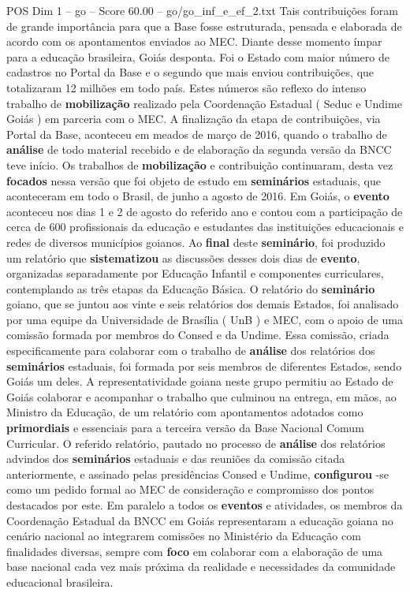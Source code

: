 \begin{textsample}{POS Dim 1 – go – Score 60.00 – go/go\_inf\_e\_ef\_2.txt}
Tais contribuições foram de grande importância para que a Base fosse estruturada, pensada e elaborada de acordo com os apontamentos enviados ao MEC.
Diante desse momento ímpar para a educação brasileira, Goiás desponta.
Foi o Estado com maior número de cadastros no Portal da Base e o segundo que mais enviou contribuições, que totalizaram 12 milhões em todo país.
Estes números são reflexo do intenso trabalho de \textbf{mobilização} realizado pela Coordenação Estadual ( Seduc e Undime Goiás ) em parceria com o MEC.
A finalização da etapa de contribuições, via Portal da Base, aconteceu em meados de março de 2016, quando o trabalho de \textbf{análise} de todo material recebido e de elaboração da segunda versão da BNCC teve início.
Os trabalhos de \textbf{mobilização} e contribuição continuaram, desta vez \textbf{focados} nessa versão que foi objeto de estudo em \textbf{seminários} estaduais, que aconteceram em todo o Brasil, de junho a agosto de 2016.
Em Goiás, o \textbf{evento} aconteceu nos dias 1 e 2 de agosto do referido ano e contou com a participação de cerca de 600 profissionais da educação e estudantes das instituições educacionais e redes de diversos municípios goianos.
Ao \textbf{final} deste \textbf{seminário}, foi produzido um relatório que \textbf{sistematizou} as discussões desses dois dias de \textbf{evento}, organizadas separadamente por Educação Infantil e componentes curriculares, contemplando as três etapas da Educação Básica.
O relatório do \textbf{seminário} goiano, que se juntou aos vinte e seis relatórios dos demais Estados, foi analisado por uma equipe da Universidade de Brasília ( UnB ) e MEC, com o apoio de uma comissão formada por membros do Consed e da Undime.
Essa comissão, criada especificamente para colaborar com o trabalho de \textbf{análise} dos relatórios dos \textbf{seminários} estaduais, foi formada por seis membros de diferentes Estados, sendo Goiás um deles.
A representatividade goiana neste grupo permitiu ao Estado de Goiás colaborar e acompanhar o trabalho que culminou na entrega, em mãos, ao Ministro da Educação, de um relatório com apontamentos adotados como \textbf{primordiais} e essenciais para a terceira versão da Base Nacional Comum Curricular.
O referido relatório, pautado no processo de \textbf{análise} dos relatórios advindos dos \textbf{seminários} estaduais e das reuniões da comissão citada anteriormente, e assinado pelas presidências Consed e Undime, \textbf{configurou} -se como um pedido formal ao MEC de consideração e compromisso dos pontos destacados por este.
Em paralelo a todos os \textbf{eventos} e atividades, os membros da Coordenação Estadual da BNCC em Goiás representaram a educação goiana no cenário nacional ao integrarem comissões no Ministério da Educação com finalidades diversas, sempre com \textbf{foco} em colaborar com a elaboração de uma base nacional cada vez mais próxima da realidade e necessidades da comunidade educacional brasileira.

\end{textsample}
